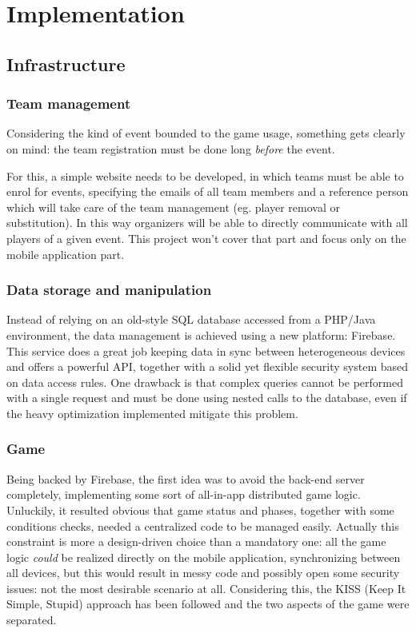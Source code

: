 \chapter{Implementation}

	\section{Infrastructure}
		
		\subsection{Team management}
		
			Considering the kind of event bounded to the game usage, something gets clearly on mind: the team registration must be done long \emph{before} the event.
			
			For this, a simple website needs to be developed, in which teams must be able to enrol for events, specifying the emails of all team members and a reference person which will take care of the team management (eg. player removal or substitution).
			In this way organizers will be able to directly communicate with all players of a given event.
			This project won't cover that part and focus only on the mobile application part.
		
		\subsection{Data storage and manipulation}
			
			Instead of relying on an old-style SQL database accessed from a PHP/Java environment, the data management is achieved using a new platform: Firebase.
			This service does a great job keeping data in sync between heterogeneous devices and offers a powerful API, together with a solid yet flexible security system based on data access rules.
			One drawback is that complex queries cannot be performed with a single request and must be done using nested calls to the database, even if the heavy optimization implemented mitigate this problem.
		
		\subsection{Game}
		
			Being backed by Firebase, the first idea was to avoid the back-end server completely, implementing some sort of all-in-app distributed game logic.
			Unluckily, it resulted obvious that game status and phases, together with some conditions checks, needed a centralized code to be managed easily.
			Actually this constraint is more a design-driven choice than a mandatory one: all the game logic \emph{could} be realized directly on the mobile application, synchronizing between all devices, but this would result in messy code and possibly open some security issues: not the most desirable scenario at all.
			Considering this, the KISS (Keep It Simple, Stupid) approach has been followed and the two aspects of the game were separated.
			
